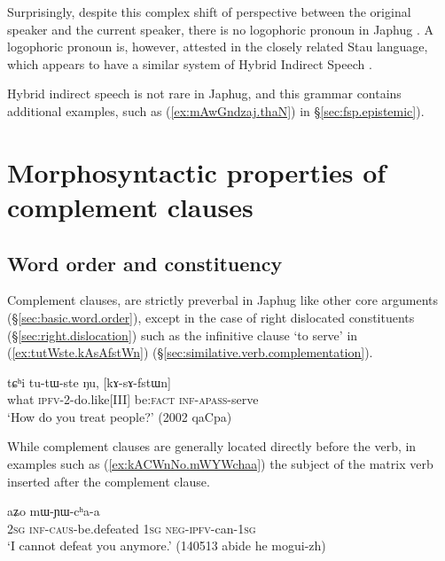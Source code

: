 Surprisingly, despite this complex shift of perspective between the original speaker and the current speaker, there is no logophoric pronoun in Japhug \citep{hagege74logophoriques, nikitina12logophoric}. A logophoric pronoun is, however, attested in the closely related Stau language, which appears to have a similar system of Hybrid Indirect Speech \citep{jacques17stau}.

Hybrid indirect speech is not rare in Japhug, and this grammar contains additional examples, such as  (\ref{ex:mAwGndzaj.thaN}) in §\ref{sec:fsp.epistemic}).



\section{Morphosyntactic properties of complement clauses}  \label{sec:complement.morphosyntax}
\subsection{Word order and constituency}  \label{sec:complement.word.order}
Complement clauses, are strictly preverbal in Japhug like other core arguments (§\ref{sec:basic.word.order}), except in the case of right dislocated constituents (§\ref{sec:right.dislocation}) such as the infinitive clause  `to serve' in (\ref{ex:tutWste.kAsAfstWn}) (§\ref{sec:similative.verb.complementation}).

\begin{exe}
\ex \label{ex:tutWste.kAsAfstWn}
\gll tɕʰi tu-tɯ-ste ŋu, [kɤ-sɤ-fstɯn]\\
what \textsc{ipfv}-2-do.like[III] be:\textsc{fact} \textsc{inf}-\textsc{apass}-serve \\
\glt `How do you treat people?' (2002 qaCpa)
\end{exe}

While complement clauses are generally located directly before the verb, in examples such as (\ref{ex:kACWnNo.mWYWchaa}) the subject of the matrix verb inserted after the complement clause.

\begin{exe}
\ex \label{ex:kACWnNo.mWYWchaa}
 aʑo mɯ-ɲɯ-cʰa-a \\
\textsc{2sg} \textsc{inf}-\textsc{caus}-be.defeated \textsc{1sg} \textsc{neg}-\textsc{ipfv}-can-\textsc{1sg} \\
\glt `I cannot defeat you anymore.' (140513 abide he mogui-zh)
\end{exe}

